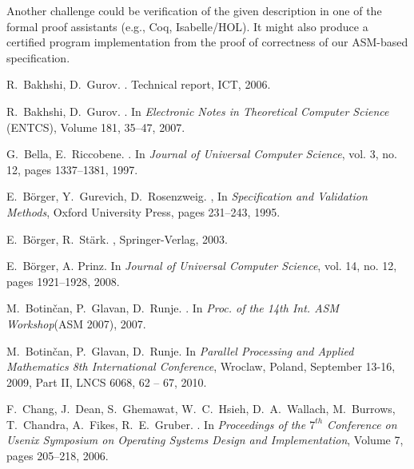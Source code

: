 \documentclass{amsart}
\theoremstyle{definition}
\begin{document}
Another challenge could be verification of the given description in one of the formal proof assistants (e.g., Coq, Isabelle/HOL). It
might also produce a certified program implementation from the proof of correctness of our ASM-based specification.




\begin{thebibliography}{}

R.~Bakhshi, D.~Gurov.
.
\newblock Technical report, ICT, 2006.

R.~Bakhshi, D.~Gurov.
.
\newblock In {\em Electronic Notes in Theoretical Computer Science} (ENTCS), Volume 181, 35--47, 2007.

 G.~Bella, E.~Riccobene.
.
\newblock In {\em Journal of Universal Computer Science}, vol. 3, no. 12, pages 1337--1381, 1997.

 E.~B\"{o}rger, Y.~Gurevich, D.~Rosenzweig.
,
\newblock In {\em Specification and Validation Methods}, Oxford University Press, pages 231--243, 1995.

E.~B\"{o}rger, R.~St\"{a}rk.
,
\newblock Springer-Verlag, 2003.

E.~B\"{o}rger, A. Prinz.
\newblock In {\em Journal of Universal Computer Science}, vol. 14, no. 12, pages 1921--1928, 2008.

 M.~Botin\v{c}an, P.~Glavan, D.~Runje.
.
\newblock In {\em Proc. of the 14th Int. ASM Workshop}(ASM 2007), 2007.

 M.~Botin\v{c}an, P.~Glavan, D.~Runje.
\newblock In {\em Parallel Processing and Applied Mathematics 8th International Conference}, Wroclaw,
Poland, September 13-16, 2009, Part II, LNCS 6068, 62 -- 67, 2010.

F.~Chang, J.~Dean, S.~Ghemawat, W.~C.~Hsieh, D.~A.~Wallach, M.~Burrows, T.~Chandra, A.~Fikes, R.~E.~Gruber.
.
\newblock In {\em Proceedings of the $7^{th}$ Conference on Usenix Symposium on Operating Systems Design and Implementation},
Volume 7, pages 205--218, 2006.


\end{thebibliography}
\end{document}

